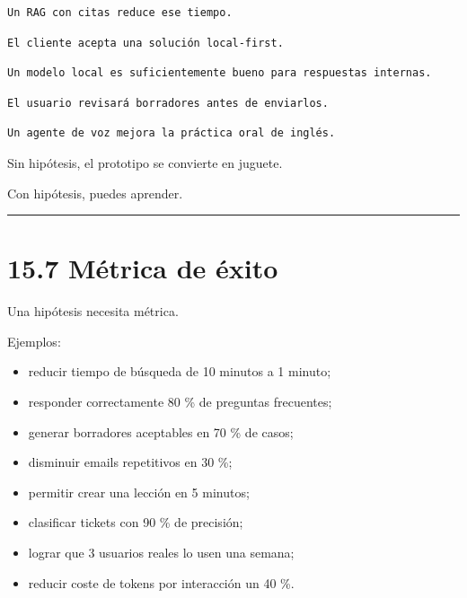 \begin{lstlisting}
Un RAG con citas reduce ese tiempo.
\end{lstlisting}

\begin{lstlisting}
El cliente acepta una solución local-first.
\end{lstlisting}

\begin{lstlisting}
Un modelo local es suficientemente bueno para respuestas internas.
\end{lstlisting}

\begin{lstlisting}
El usuario revisará borradores antes de enviarlos.
\end{lstlisting}

\begin{lstlisting}
Un agente de voz mejora la práctica oral de inglés.
\end{lstlisting}

Sin hipótesis, el prototipo se convierte en juguete.

Con hipótesis, puedes aprender.

\begin{center}\rule{0.5\linewidth}{0.5pt}\end{center}

\section{15.7 Métrica de éxito}\label{muxe9trica-de-uxe9xito}

Una hipótesis necesita métrica.

Ejemplos:

\begin{itemize}
\tightlist
\item
  reducir tiempo de búsqueda de 10 minutos a 1 minuto;
\item
  responder correctamente 80 \% de preguntas frecuentes;
\item
  generar borradores aceptables en 70 \% de casos;
\item
  disminuir emails repetitivos en 30 \%;
\item
  permitir crear una lección en 5 minutos;
\item
  clasificar tickets con 90 \% de precisión;
\item
  lograr que 3 usuarios reales lo usen una semana;
\item
  reducir coste de tokens por interacción un 40 \%.
\end{itemize}

